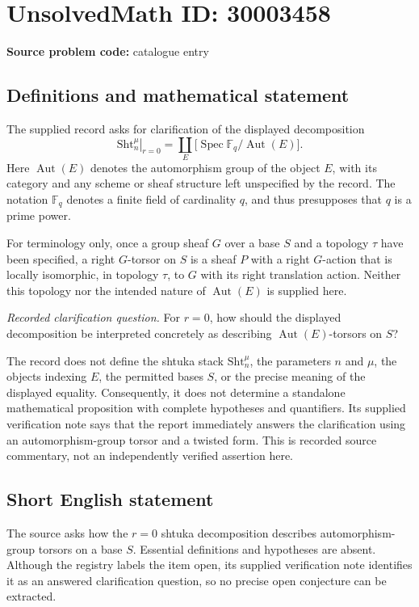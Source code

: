 \documentclass[11pt]{article}
\begin{document}
\section*{UnsolvedMath ID: 30003458}
\textbf{Source problem code:} catalogue entry
\subsection{Definitions and mathematical statement}
The supplied record asks for clarification of the displayed decomposition
\[
\left.\mathrm{Sht}^{\mu}_n\right|_{r=0}
=\coprod_E\bigl[\operatorname{Spec}\mathbb{F}_q/\operatorname{Aut}(E)\bigr].
\]
Here \(\operatorname{Aut}(E)\) denotes the automorphism group of the object \(E\), with its category and any scheme or sheaf structure left unspecified by the record. The notation \(\mathbb{F}_q\) denotes a finite field of cardinality \(q\), and thus presupposes that \(q\) is a prime power.

For terminology only, once a group sheaf \(G\) over a base \(S\) and a topology \(\tau\) have been specified, a right \(G\)-torsor on \(S\) is a sheaf \(P\) with a right \(G\)-action that is locally isomorphic, in topology \(\tau\), to \(G\) with its right translation action. Neither this topology nor the intended nature of \(\operatorname{Aut}(E)\) is supplied here.

\emph{Recorded clarification question.} For \(r=0\), how should the displayed decomposition be interpreted concretely as describing \(\operatorname{Aut}(E)\)-torsors on \(S\)?

The record does not define the shtuka stack \(\mathrm{Sht}^{\mu}_n\), the parameters \(n\) and \(\mu\), the objects indexing \(E\), the permitted bases \(S\), or the precise meaning of the displayed equality. Consequently, it does not determine a standalone mathematical proposition with complete hypotheses and quantifiers. Its supplied verification note says that the report immediately answers the clarification using an automorphism-group torsor and a twisted form. This is recorded source commentary, not an independently verified assertion here.
\subsection{Short English statement}
The source asks how the \(r=0\) shtuka decomposition describes automorphism-group torsors on a base \(S\). Essential definitions and hypotheses are absent. Although the registry labels the item open, its supplied verification note identifies it as an answered clarification question, so no precise open conjecture can be extracted.
\end{document}
